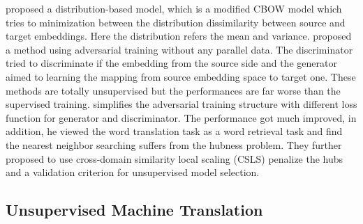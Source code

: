 \cite{cao2016distribution} proposed a distribution-based model, which is a modified CBOW model which tries to minimization between the distribution dissimilarity between source and target embeddings. Here the distribution refers the mean and variance. 
\cite{zhang2017adversarial} proposed a method using adversarial training without any parallel data. The discriminator tried to discriminate if the embedding from the source side and the generator aimed to learning the mapping from source embedding space to target one. These methods are totally unsupervised but the performances are far worse than the supervised training. \cite{conneau2017word} simplifies the adversarial training structure with different loss function for generator and discriminator. The performance got much improved, in addition, he viewed the word translation task as a word retrieval task and find the nearest neighbor searching suffers from the hubness problem. They further proposed to use cross-domain similarity local scaling (CSLS) penalize the hubs and a validation criterion for unsupervised model selection.


\subsection{Unsupervised Machine Translation}


